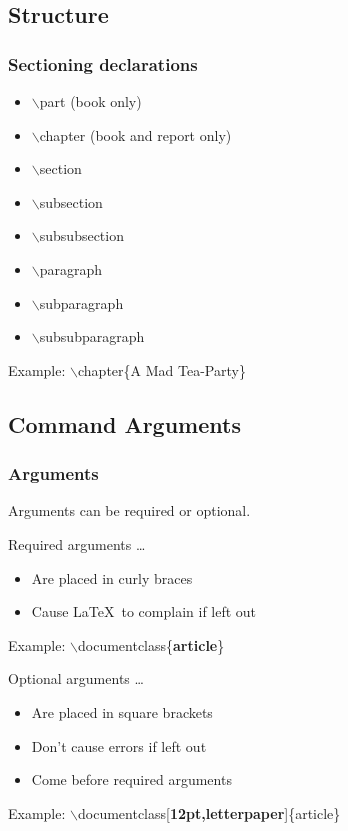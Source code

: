 \documentclass[ignorenonframetext]{beamer}
\begin{document}
\subsection{Structure}
\begin{frame}
  \frametitle{Sectioning declarations}
  \begin{itemize}
  \item $\backslash$part (book only)
  \item $\backslash$chapter (book and report only)
  \item $\backslash$section
  \item $\backslash$subsection
  \item $\backslash$subsubsection
  \item $\backslash$paragraph
  \item $\backslash$subparagraph
  \item $\backslash$subsubparagraph
  \end{itemize}
  Example: $\backslash$chapter\{A Mad Tea-Party\}
\end{frame}

\subsection{Command Arguments}
\begin{frame}
  \frametitle{Arguments}
  Arguments can be required or optional.
  \begin{block}{Required arguments \ldots}
    \begin{itemize}
    \item Are placed in curly braces
    \item Cause \LaTeX\ to complain if left out
    \end{itemize}
    Example: $\backslash$documentclass\{\textbf{article}\}
  \end{block}
  \begin{block}{Optional arguments \ldots}
    \begin{itemize}
    \item Are placed in square brackets
    \item Don't cause errors if left out
    \item Come before required arguments
    \end{itemize}
    Example: $\backslash$documentclass[\textbf{12pt,letterpaper}]\{article\}
  \end{block}
\end{frame}
\end{document}
